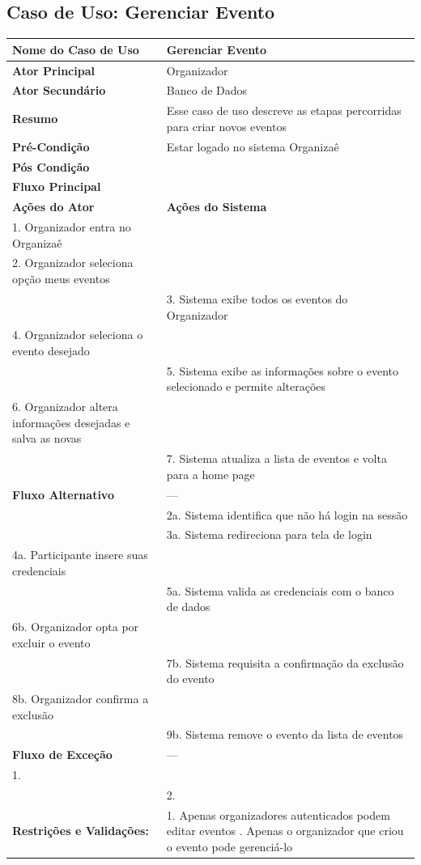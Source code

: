 \documentclass[12pt,a4paper]{article}
\begin{document}
\subsection{Caso de Uso: Gerenciar Evento}
\begin{longtable}{|p{4cm}|p{11cm}|}
\hline
\textbf{Nome do Caso de Uso} & Gerenciar Evento \\ \hline
\textbf{Ator Principal} & Organizador \\ \hline
\textbf{Ator Secundário} & Banco de Dados \\ \hline
\textbf{Resumo} & Esse caso de uso descreve as etapas percorridas para criar novos eventos \\ \hline
\textbf{Pré-Condição} & Estar logado no sistema Organizaê \\ \hline
\textbf{Pós Condição} & \\ \hline
\textbf{Fluxo Principal} & \\ \hline
\textbf{Ações do Ator} & \textbf{Ações do Sistema} \\ \hline
1. Organizador entra no Organizaê & \\ \hline
2. Organizador seleciona opção meus eventos & \\ \hline
& 3. Sistema exibe todos os eventos do Organizador \\ \hline
4. Organizador seleciona o evento desejado & \\ \hline
& 5. Sistema exibe as informações sobre o evento selecionado e permite alterações \\ \hline
6. Organizador altera informações desejadas e salva as novas & \\ \hline
& 7. Sistema atualiza a lista de eventos e volta para a home page \\ \hline
\textbf{Fluxo Alternativo} & --- \\ \hline
& 2a. Sistema identifica que não há login na sessão \\ \hline
& 3a. Sistema redireciona para tela de login \\ \hline
4a. Participante insere suas credenciais & \\ \hline
& 5a. Sistema valida as credenciais com o banco de dados \\ \hline
6b. Organizador opta por excluir o evento & \\ \hline
& 7b. Sistema requisita a confirmação da exclusão do evento \\ \hline
8b. Organizador confirma a exclusão & \\ \hline
& 9b. Sistema remove o evento da lista de eventos \\ \hline
\textbf{Fluxo de Exceção} & --- \\ \hline
1. & \\ \hline
& 2. \\ \hline
\textbf{Restrições e Validações:} & 1. Apenas organizadores autenticados podem editar eventos \newline 2. Apenas o organizador que criou o evento pode gerenciá-lo \\ \hline
\end{longtable}
\end{document}
